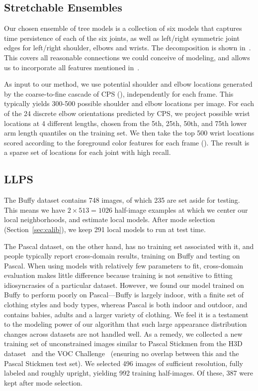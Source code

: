 \subsection{Stretchable Ensembles}
Our chosen ensemble of tree models is a collection of six models that captures 
time persistence of each of the six joints, as well as left/right symmetric 
joint edges for left/right shoulder, elbows and wrists.  The decomposition is 
shown in~.  This covers all reasonable connections 
we could conceive of modeling, and allows us to incorporate all features 
mentioned in~.

As input to our method, we use potential shoulder and elbow locations generated 
by the coarse-to-fine cascade of CPS (), independently for each 
frame.  This typically yields 300-500 possible shoulder and elbow locations per 
image. For each of the 24 discrete elbow orientations predicted by CPS, we 
project possible wrist locations at 4 different lengths, chosen from the 5th, 
25th, 50th, and 75th lower arm length quantiles on the training set. We then 
take the top 500 wrist locations scored according to the foreground color 
features for each frame (). The result is a sparse set of 
locations for each joint with high recall.


\subsection{LLPS}
The Buffy dataset contains 748 images, of which 235 are set aside for testing.  
This means we have $2\times 513 = 1026$ half-image examples at which we center 
our local neighborhoods, and estimate local models.  After mode selection 
(Section~\ref{sec:calib}), we keep 291 local models to run at test time.  

The Pascal dataset, on the other hand, has no training set associated with it, 
and people typically report cross-domain results, training on Buffy and testing 
on Pascal.  When using models with relatively few parameters to fit, 
cross-domain evaluation makes little difference because training is not 
sensitive to fitting idiosyncrasies of a particular dataset.  However, we found 
our model trained on Buffy to perform poorly on Pascal---Buffy is largely 
indoor, with a finite set of clothing styles and body types, whereas Pascal is 
both indoor and outdoor, and contains babies, adults and a larger variety of 
clothing.  We feel it is a testament to the modeling power of our algorithm 
that such large appearance distribution changes across datasets are not handled 
well.  As a remedy, we collected a new training set of unconstrained images 
similar to Pascal Stickmen from the H3D dataset~\cite{bourdev09} and the VOC 
Challenge~\cite{voc09} (ensuring no overlap between this and the Pascal 
Stickmen test set).  We selected 496 images of sufficient resolution, fully 
labeled and roughly upright, yielding 992 training half-images.  Of these, 387 
were kept after mode selection.


